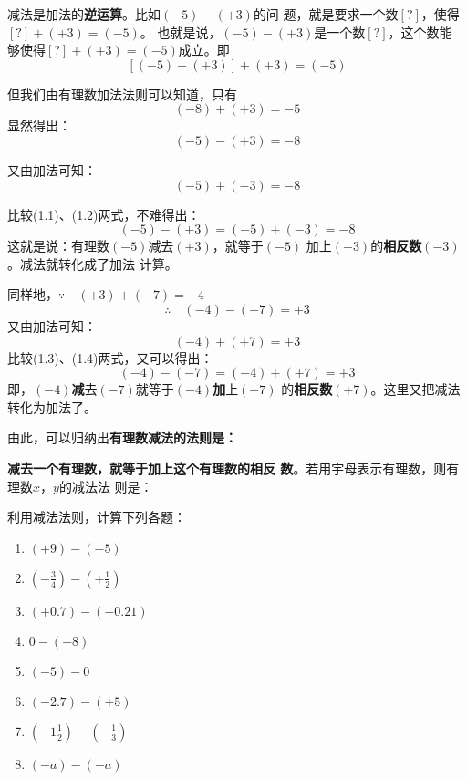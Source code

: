减法是加法的\textbf{逆运算}。比如$(-5)-(+3)$的问
题，就是要求一个数$[?]$，使得$[?]+(+3)=(-5)$。
也就是说，$(-5)-(+ 3)$是一个数$[?]$，这个数能
够使得$[?]+(+3)=(-5)$成立。即
$$[(-5)-(+3) ]+(+3)=(-5)$$

    但我们由有理数加法法则可以知道，只有
\[(-8)+(+3)=-5\]
显然得出：
\begin{equation}
    (-5)-(+3)=-8
\end{equation}

又由加法可知：
\begin{equation}
    (-5)+(-3)=-8
\end{equation}

比较(1.1)、(1.2)两式，不难得出：
     \[ (-5)-(+3)=(-5)+(-3)=-8\]
这就是说：有理数$(-5)$减去$(+ 3)$，就等于$(-5)$
加上$(+ 3)$的\textbf{相反数}$(-3)$。减法就转化成了加法
计算。

    同样地，$\because\quad (+3)+(-7)=-4$
    \begin{equation}
     \therefore\quad    (-4)-(-7)=+3
    \end{equation}    
    又由加法可知：
    \begin{equation}
        (-4)+(+7)=+3
    \end{equation}
    比较(1.3)、(1.4)两式，又可以得出：
    \[ (-4)-(-7)= (-4)+(+7)=+3\]
    即，$(-4)$\textbf{减}去$(-7)$就等于$(-4)$\textbf{加}上$(-7)$
    的\textbf{相反数}$(+7)$。这里又把减法转化为加法了。

        由此，可以归纳出\textbf{有理数减法的法则是：}

        \textbf{减去一个有理数，就等于加上这个有理数的相反
    数}。若用宇母表示有理数，则有理数$x$，$y$的减法法
    则是：
    
\begin{center}
\end{center}

\begin{example}
    利用减法法则，计算下列各题：
\begin{multicols}{2}
    \begin{enumerate}
        \item $(+9)-(-5)$
        \item $\left(-\frac{3}{4}\right)-\left(+\frac{1}{2}\right)$
        \item $(+0.7)-(-0.21)$
        \item $0-(+8)$
        \item $(-5)-0$
        \item $(-2.7)-(+5)$
        \item $\left(-1\frac{1}{2}\right)-\left(-\frac{1}{3}\right)$
        \item $(-a)-(-a)$
    \end{enumerate}
\end{multicols}
\end{example}

